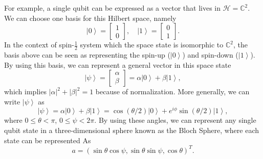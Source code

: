 \documentclass[11pt]{article}
\newcommand{\ket}[1]{\left|#1\right\rangle}
\begin{document}
For example, a single qubit can be expressed as a vector that lives in $\mathcal{H} = \mathbb{C}^2$. We can choose one basis for this Hilbert space, namely
\begin{equation}
    \ket{0} = \begin{bmatrix}
        1 \\
        0
    \end{bmatrix}, \quad \ket{1} = \begin{bmatrix}
        0 \\
        1
    \end{bmatrix}.
\end{equation}
In the context of spin-$\frac{1}{2}$ system which the space state is isomorphic to $\mathbb{C}^2$, the basis above can be seen as representing the spin-up ($\ket{0}$) and spin-down ($\ket{1}$). By using this basis, we can represent a general vector in this space state
\begin{equation}
    \ket{\psi} = \begin{bmatrix}
        \alpha \\
        \beta
    \end{bmatrix} = \alpha\ket{0} + \beta\ket{1},
\end{equation}
which implies $|\alpha|^2 + |\beta|^2 = 1$ because of normalization. More generally, we can write $\ket{\psi}$ as 
\begin{equation}
    \ket{\psi} = \alpha\ket{0} + \beta\ket{1} = \cos(\theta/2)\ket{0} + e^{i\phi}\sin(\theta/2)\ket{1},
\end{equation}
where $0\leq\theta<\pi$, $0\leq\psi<2\pi$. By using these angles, we can represent any single qubit state in a three-dimensional sphere known as the Bloch Sphere, where each state can be represented As
\begin{equation}
    a = (\sin\theta\cos\psi, \sin\theta\sin\psi, \cos\theta)^T.
\end{equation}
\end{document}
